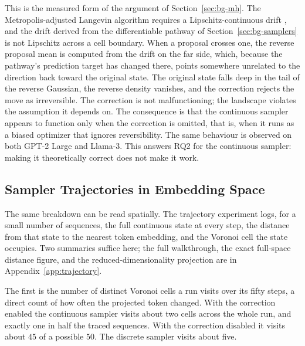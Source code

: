 This is the measured form of the argument of Section~\ref{sec:bg-mh}. The Metropolis-adjusted Langevin algorithm requires a Lipschitz-continuous drift \citep{roberts1996exponential}, and the drift derived from the differentiable pathway of Section~\ref{sec:bg-samplers} is not Lipschitz across a cell boundary. When a proposal crosses one, the reverse proposal mean is computed from the drift on the far side, which, because the pathway's prediction target has changed there, points somewhere unrelated to the direction back toward the original state. The original state falls deep in the tail of the reverse Gaussian, the reverse density vanishes, and the correction rejects the move as irreversible. The correction is not malfunctioning; the landscape violates the assumption it depends on. The consequence is that the continuous sampler appears to function only when the correction is omitted, that is, when it runs as a biased optimizer that ignores reversibility. The same behaviour is observed on both GPT-2 Large and Llama-3. This answers RQ2 for the continuous sampler: making it theoretically correct does not make it work.

\subsection{Sampler Trajectories in Embedding Space}
\label{sec:results-traj}

The same breakdown can be read spatially. The trajectory experiment logs, for a small number of sequences, the full continuous state at every step, the distance from that state to the nearest token embedding, and the Voronoi cell the state occupies. Two summaries suffice here; the full walkthrough, the exact full-space distance figure, and the reduced-dimensionality projection are in Appendix~\ref{app:trajectory}.

The first is the number of distinct Voronoi cells a run visits over its fifty steps, a direct count of how often the projected token changed. With the correction enabled the continuous sampler visits about two cells across the whole run, and exactly one in half the traced sequences.
With the correction disabled it visits about $45$ of a possible $50$.
The discrete sampler visits about five.

